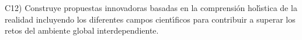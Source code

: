 C12) Construye propuestas innovadoras basadas en la comprensi\'{o}n
hol\'{\i}stica de la realidad incluyendo los diferentes campos cient\'{\i}ficos
para contribuir a superar los retos del ambiente global
interdependiente.
